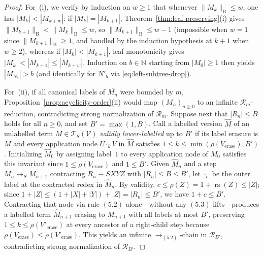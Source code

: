 \documentclass[11pt,reqno]{amsart}
\numberwithin{equation}{section}
\theoremstyle{plain}
\theoremstyle{definition}
\theoremstyle{remark}
\DeclareMathOperator{\rs}{rs}
\newcommand{\TSV}{\mathcal{T}_S(\mathcal{V})}
\newcommand{\redS}{\to_S}
\begin{document}
\begin{proof}
For~(i), we verify by induction on $w \ge 1$ that whenever $\|M_k\|_{\mathrm{B}} \le w$, one has $|M_k| < |M_{k+w}|$: if $|M_k| = |M_{k+1}|$, Theorem~\ref{thm:leaf-preserving}(i) gives $\|M_{k+1}\|_{\mathrm{B}} < \|M_k\|_{\mathrm{B}} \le w$, so $\|M_{k+1}\|_{\mathrm{B}} \le w - 1$ (impossible when $w = 1$ since $\|M_{k+1}\|_{\mathrm{B}} \ge 1$, and handled by the induction hypothesis at $k + 1$ when $w \ge 2$), whereas if $|M_k| < |M_{k+1}|$, leaf monotonicity gives $|M_k| < |M_{k+1}| \le |M_{k+w}|$. Induction on $b \in \mathbb{N}$ starting from $|M_0| \ge 1$ then yields $|M_{N_b}| > b$ (and identically for $N'_b$ via \eqref{eq:left-subtree-drop}).

For~(ii), if all canonical labels of $\overline{M_n}$ were bounded by $m$, Proposition~\ref{prop:acyclicity-order}(ii) would map $(M_n)_{n \ge 0}$ to an infinite $\mathcal{R}_m$-reduction, contradicting strong normalization of $\mathcal{R}_m$. Suppose next that $|R_n| \le B$ holds for all $n \ge 0$, and set $B' = \max(1, B)$. Call a labelled version $\widehat{M}$ of an unlabelled term $M \in \TSV$ \emph{validly lower-labelled} up to $B'$ if its label erasure is $M$ and every application node $U \cdot_k V$ in $\widehat{M}$ satisfies $1 \le k \le \min(\rho(V_{\mathrm{erase}}), B')$. Initializing $\widehat{M}_0$ by assigning label~$1$ to every application node of $M_0$ satisfies this invariant since $1 \le \rho(V_{\mathrm{erase}})$ and $1 \le B'$. Given $\widehat{M}_n$ and a step $M_n \redS M_{n+1}$ contracting $R_n \equiv S X Y Z$ with $|R_n| \le B \le B'$, let $\cdot_c$ be the outer label at the contracted redex in $\widehat{M}_n$. By validity, $c \le \rho(Z) = 1 + \rs(Z) \le |Z|$; since $1 + |Z| \le (1 + |X| + |Y|) + |Z| = |R_n| \le B'$, we have $1 + c \le B'$. Contracting that node via rule $(5.2)$ alone---without any $(5.3)$ lifts---produces a labelled term $\widehat{M}_{n+1}$ erasing to $M_{n+1}$ with all labels at most $B'$, preserving $1 \le k \le \rho(V'_{\mathrm{erase}})$ at every ancestor of a right-child step because $\rho(V_{\mathrm{erase}}) \le \rho(V'_{\mathrm{erase}})$. This yields an infinite $\to_{(5.2)}$-chain in $\mathcal{R}_{B'}$, contradicting strong normalization of $\mathcal{R}_{B'}$.


\end{proof}
\end{document}
